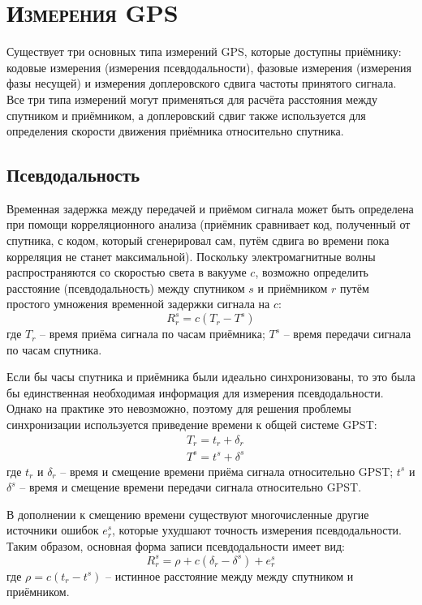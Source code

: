 \section{\textsc{Измерения GPS}}

Существует три основных типа измерений GPS, которые доступны приёмнику: кодовые измерения (измерения псевдодальности), фазовые измерения (измерения фазы несущей) и измерения доплеровского сдвига частоты принятого сигнала.  
Все три типа измерений могут применяться для расчёта расстояния между спутником и приёмником, а доплеровский сдвиг также используется для определения скорости движения приёмника относительно спутника.

\subsection*{\textbf{Псевдодальность}}

Временная задержка между передачей и приёмом сигнала может быть определена при помощи корреляционного анализа (приёмник сравнивает код, полученный от спутника, с кодом, который сгенерировал сам, путём сдвига во времени пока корреляция не станет максимальной).
Поскольку электромагнитные волны распространяются со скоростью света в вакууме $c$, возможно определить расстояние (псевдодальность) между спутником $s$ и приёмником $r$ путём простого умножения временной задержки сигнала на $c$:
\begin{equation}
R_r^s=c(T_r-T^s)    
\end{equation}
где 
$T_r$ -- время приёма сигнала по часам приёмника;
$T^s$ -- время передачи сигнала по часам спутника. 

Если бы часы спутника и приёмника были идеально синхронизованы, то это была бы единственная необходимая информация для измерения псевдодальности.
Однако на практике это невозможно, поэтому для решения проблемы синхронизации используется приведение времени к общей системе GPST:
\begin{equation}
\begin{aligned}
&T_r=t_r+\delta_r \\
&T^s=t^s+\delta^s
\end{aligned}    
\end{equation}
где 
$t_r$ и $\delta_r$ -- время и смещение времени приёма сигнала относительно GPST;
$t^s$ и $\delta^s$ -- время и смещение времени передачи сигнала относительно GPST.   

В дополнении к смещению времени существуют многочисленные другие источники ошибок $e_r^s$, которые ухудшают точность измерения псевдодальности.
Таким образом, основная форма записи псевдодальности имеет вид:
\begin{equation}
\label{eq-pr}
R_r^s=\rho+c(\delta_r-\delta^s)+e_r^s    
\end{equation}
где 
$\rho=c(t_r-t^s)$ -- истинное расстояние между между спутником и приёмником.

